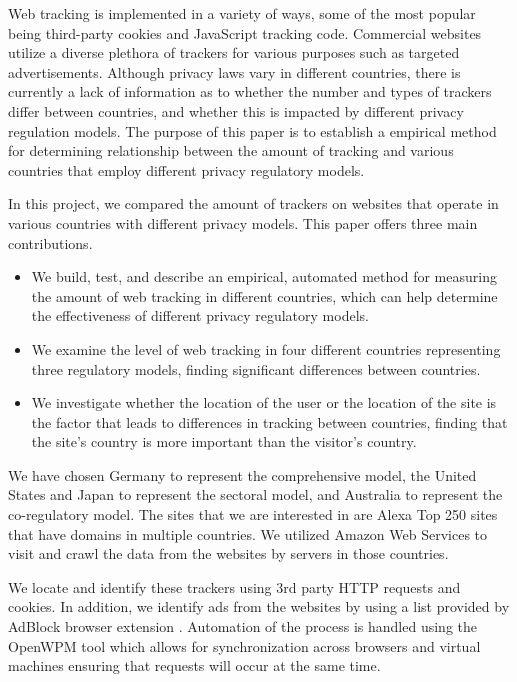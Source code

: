 \documentclass[conference]{IEEEtran}
\begin{document}
Web tracking is implemented in a variety of ways, some of the most popular being third-party cookies and JavaScript tracking code. Commercial websites utilize a diverse plethora of trackers for various purposes such as targeted advertisements. Although privacy laws vary in different countries, there is currently a lack of information as to whether the number and types of trackers differ between countries, and whether this is impacted by different privacy regulation models. The purpose of this paper is to establish a empirical method for determining relationship between the amount of tracking and various countries that employ different privacy regulatory models.

In this project, we compared the amount of trackers on websites that operate in various countries with different privacy models. This paper offers three main contributions.
\begin{itemize}
\item We build, test, and describe an empirical, automated method for measuring the amount of web tracking in different countries, which can help determine the effectiveness of different privacy regulatory models.
\item We examine the level of web tracking in four different countries representing three regulatory models, finding significant differences between countries.
\item We investigate whether the location of the user or the location of the site is the factor that leads to differences in tracking between countries, finding that the site's country is more important than the visitor's country.
\end{itemize}

We have chosen Germany to represent the comprehensive model, the United States and Japan to represent the sectoral model, and Australia to represent the co-regulatory model. The sites that we are interested in are Alexa Top 250 sites \cite{Alexa} that have domains in multiple countries. We utilized Amazon Web Services to visit and crawl the data from the websites by servers in those countries.

We locate and identify these trackers using 3rd party HTTP requests and cookies. In addition, we identify ads from the websites by using a list provided by AdBlock browser extension \cite{adblock}. Automation of the process is handled using the OpenWPM \cite{openwpm} tool which allows for synchronization across browsers and virtual machines ensuring that requests will occur at the same time. 
\end{document}
